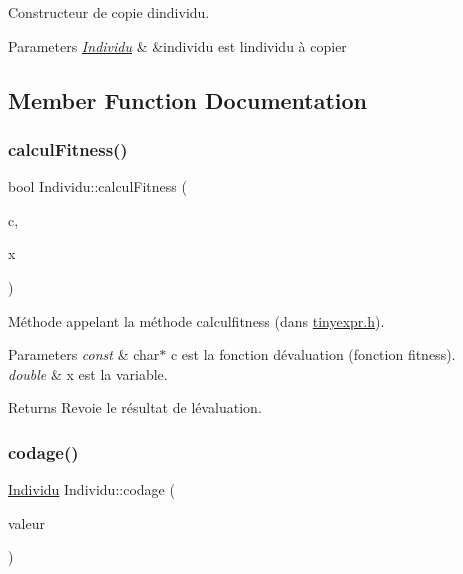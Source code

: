 Constructeur de copie d\textquotesingle{}individu. 


\begin{DoxyParams}{Parameters}
{\em \hyperlink{class_individu}{Individu}} & \&individu est l\textquotesingle{}individu à copier \\
\hline
\end{DoxyParams}


\subsection{Member Function Documentation}
\mbox{\label{class_individu_a64f2fa488b556be95d6dda1005417eb6}} 
\subsubsection{\texorpdfstring{calcul\+Fitness()}{calculFitness()}}
{\footnotesize\ttfamily bool Individu\+::calcul\+Fitness (\begin{DoxyParamCaption}\item[{const char $\ast$}]{c,  }\item[{double}]{x }\end{DoxyParamCaption})}



Méthode appelant la méthode calculfitness (dans \hyperlink{tinyexpr_8h_source}{tinyexpr.\+h}). 


\begin{DoxyParams}{Parameters}
{\em const} & char$\ast$ c est la fonction d\textquotesingle{}évaluation (fonction fitness). \\
\hline
{\em double} & x est la variable. \\
\hline
\end{DoxyParams}
\begin{DoxyReturn}{Returns}
Revoie le résultat de l\textquotesingle{}évaluation. 
\end{DoxyReturn}
\mbox{\label{class_individu_a4e531bc1f39a0f9684b8c9d75fb0fcd1}} 
\subsubsection{\texorpdfstring{codage()}{codage()}}
{\footnotesize\ttfamily \hyperlink{class_individu}{Individu} Individu\+::codage (\begin{DoxyParamCaption}\item[{int}]{valeur }\end{DoxyParamCaption})}



